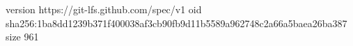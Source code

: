 version https://git-lfs.github.com/spec/v1
oid sha256:1ba8dd1239b371f400038af3cb90fb9d11b5589a962748c2a66a5baea26ba387
size 961

